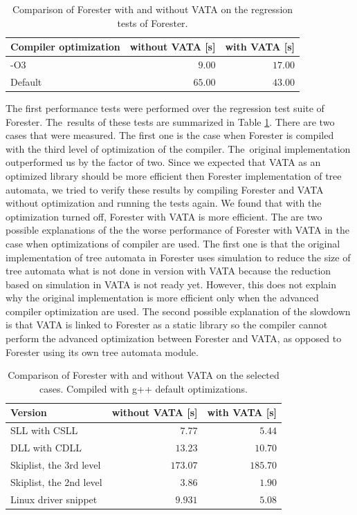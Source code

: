 \begin{table}[bt]
	\vskip6pt
	\caption{Comparison of Forester with and without VATA on the regression tests of Forester.
	}
	\centering
	\begin{tabular}{|l | r | r |}
		\hline
		Compiler optimization & without VATA [s] & with VATA [s] \\
		\hline
		\hline
		-O3        & $9.00$ & $17.00$ \\
		\hline
		Default    & $65.00$ & $43.00$ \\
		\hline
	\end{tabular}
	\label{tab:vataregre}
\end{table}

The first performance tests were performed over the regression test suite of Forester.
The~results of these tests are summarized in Table \ref{tab:vataregre}.
There are two cases that were measured.
The first one is the case when Forester is compiled with the third level of optimization of the compiler.
The~original implementation outperformed us by the factor of two.
Since we expected that VATA as an optimized library should be more efficient
then Forester implementation of tree automata, we tried to verify these results
by compiling Forester and VATA without optimization and running the tests again.
We found that with the optimization turned off,
Forester with VATA is more efficient.
The are two possible explanations of the the worse performance of Forester with VATA
in the case when optimizations of compiler are used.
The first one is that the original implementation of tree automata
in Forester uses simulation to reduce the size of tree automata
what is not done in version with VATA because the reduction
based on simulation in VATA is not ready yet.
However, this does not explain why the original implementation is more efficient
only when the advanced compiler optimization are used.
The second possible explanation of the slowdown is
that VATA is linked to Forester as a static library so the compiler cannot
perform the advanced optimization between Forester and VATA, as opposed to
Forester using its own tree automata module.


\begin{table}[bt]
	\vskip6pt
	\caption{Comparison of Forester with and without VATA on the selected cases.
		Compiled with g++ default optimizations.
	}
	\centering
	\begin{tabular}{|l | r | r |}
		\hline
		Version & without VATA [s] & with VATA [s] \\
		\hline
		\hline
		SLL with CSLL            & $7.77$ & $5.44$ \\
		\hline
		DLL with CDLL            & $13.23$ & $10.70$ \\
		\hline
		Skiplist, the 3rd level  & $173.07$ & $185.70$ \\
		\hline
		Skiplist, the 2nd level  & $3.86$ & $1.90$ \\
		\hline
		Linux driver snippet     & $9.931$ & $5.08$  \\ 
		\hline
	\end{tabular}
	\label{tab:vatadef}
\end{table}

